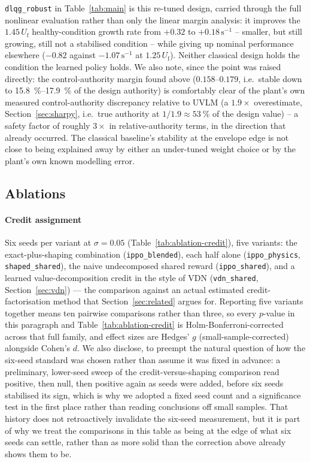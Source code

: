 \documentclass[preprint,11pt,authoryear]{elsarticle}
\newcommand{\Uf}{U_{\mathrm{f}}}
\begin{document}
\texttt{dlqg\_robust} in Table~\ref{tab:main} is this re-tuned design, carried
through the full nonlinear evaluation rather than only the linear margin
analysis: it improves the $1.45\,\Uf$ healthy-condition growth rate from
$+0.32$ to $+0.18\,\mathrm{s}^{-1}$ -- smaller, but still growing, still not a
stabilised condition -- while giving up nominal performance elsewhere ($-0.82$
against $-1.07\,\mathrm{s}^{-1}$ at $1.25\,\Uf$). Neither classical design
holds the condition the learned policy holds. We also note, since the point
was raised directly: the control-authority margin found above ($0.158$--$0.179$,
i.e.\ stable down to \SIrange{15.8}{17.9}{\percent} of the design authority) is
comfortably clear of the plant's own measured control-authority discrepancy
relative to UVLM (a $1.9\times$ overestimate, Section~\ref{sec:sharpy}, i.e.\
true authority at $1/1.9\approx\SI{53}{\percent}$ of the design value) -- a
safety factor of roughly $3\times$ in relative-authority terms, in the
direction that already occurred. The classical baseline's stability at the
envelope edge is not close to being explained away by either an under-tuned
weight choice or by the plant's own known modelling error.

\subsection{Ablations}
\label{sec:ablations}

\paragraph{Credit assignment}
Six seeds per variant at $\sigma=0.05$ (Table~\ref{tab:ablation-credit}), five
variants: the exact-plus-shaping combination (\texttt{ippo\_blended}), each
half alone (\texttt{ippo\_physics}, \texttt{shaped\_shared}), the naive
undecomposed shared reward (\texttt{ippo\_shared}), and a learned
value-decomposition credit in the style of VDN \citep{sunehag2018vdn}
(\texttt{vdn\_shared}, Section~\ref{sec:vdn}) --- the comparison against an
actual estimated credit-factorisation method that Section~\ref{sec:related}
argues for. Reporting five variants together means ten pairwise comparisons
rather than three, so every $p$-value in this paragraph and
Table~\ref{tab:ablation-credit} is Holm-Bonferroni-corrected across that full
family, and effect sizes are Hedges' $g$ (small-sample-corrected) alongside
Cohen's $d$. We also disclose, to preempt the natural question of how the
six-seed standard was chosen rather than assume it was fixed in advance: a
preliminary, lower-seed sweep of the credit-versus-shaping comparison read
positive, then null, then positive again as seeds were added, before six
seeds stabilised its sign, which is why we adopted a fixed seed count and a
significance test in the first place rather than reading conclusions off
small samples. That history does not
retroactively invalidate the six-seed measurement, but it is part of why we
treat the comparisons in this table as being at the edge of what six seeds can
settle, rather than as more solid than the correction above already shows them
to be.
\end{document}
